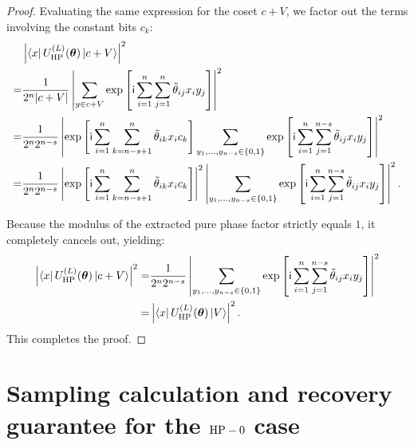 \begin{proof}
    Evaluating the same expression for the coset $c+V$, we factor out the terms involving the constant bits $c_k$:
    \begin{align}
        &\left|\bra{x}U_{\mathrm{HP}}^{(L)}(\bm \theta)\ket{c+V}\right|^2 \notag \\
        =& \frac{1}{2^n |c+V|}\left|\sum_{y\in c+V}  \exp\left[ \mathsf{i} \sum_{i=1}^n \sum_{j=1}^n \tilde{\theta}_{ij} x_i y_j \right] \right|^2 \\
        =& \frac{1}{2^n 2^{n-s}}\left| \exp\left[ \mathsf{i} \sum_{i=1}^n \sum_{k=n-s+1}^n \tilde{\theta}_{ik} x_i c_k \right] \sum_{y_1, \dots, y_{n-s} \in \{0,1\}} \exp\left[ \mathsf{i} \sum_{i=1}^n \sum_{j=1}^{n-s} \tilde{\theta}_{ij} x_i y_j \right] \right|^2 \\
        =& \frac{1}{2^n 2^{n-s}}\left| \exp\left[ \mathsf{i} \sum_{i=1}^n \sum_{k=n-s+1}^n \tilde{\theta}_{ik} x_i c_k \right] \right|^2 \left| \sum_{y_1, \dots, y_{n-s} \in \{0,1\}} \exp\left[ \mathsf{i} \sum_{i=1}^n \sum_{j=1}^{n-s} \tilde{\theta}_{ij} x_i y_j \right] \right|^2.
    \end{align}
    
    Because the modulus of the extracted pure phase factor strictly equals $1$, it completely cancels out, yielding:
    \begin{align}
        \left|\bra{x}U_{\mathrm{HP}}^{(L)}(\bm \theta)\ket{c+V}\right|^2
        =& \frac{1}{2^n 2^{n-s}}\left| \sum_{y_1, \dots, y_{n-s} \in \{0,1\}} \exp\left[ \mathsf{i} \sum_{i=1}^n \sum_{j=1}^{n-s} \tilde{\theta}_{ij} x_i y_j \right] \right|^2 \\
        =&\left|\bra{x}U_{\mathrm{HP}}^{(L)}(\bm \theta)\ket{V}\right|^2.
    \end{align}
    This completes the proof.
\end{proof}


\section{Sampling calculation and recovery guarantee for the \(\text{HP}-0\) case}



